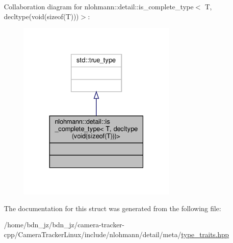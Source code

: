 Collaboration diagram for nlohmann\+:\+:detail\+:\+:is\+\_\+complete\+\_\+type$<$ T, decltype(void(sizeof(T)))$>$\+:\nopagebreak
\begin{figure}[H]
\begin{center}
\leavevmode
\includegraphics[width=223pt]{structnlohmann_1_1detail_1_1is__complete__type_3_01_t_00_01decltype_07void_07sizeof_07_t_08_08_08_4__coll__graph}
\end{center}
\end{figure}


The documentation for this struct was generated from the following file\+:\begin{DoxyCompactItemize}
\item 
/home/bdn\+\_\+jz/bdn\+\_\+jz/camera-\/tracker-\/cpp/\+Camera\+Tracker\+Linux/include/nlohmann/detail/meta/\hyperlink{type__traits_8hpp}{type\+\_\+traits.\+hpp}\end{DoxyCompactItemize}
